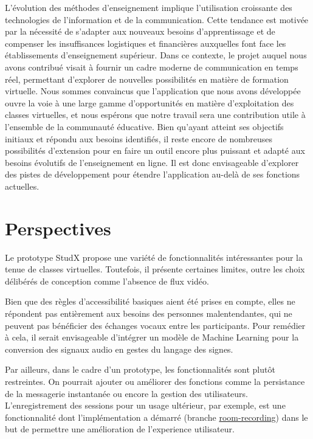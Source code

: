 \conclusion
L'évolution des méthodes d'enseignement implique l'utilisation croissante des technologies de l'information et de la communication. 
Cette tendance est motivée par la nécessité de s'adapter aux nouveaux besoins d'apprentissage et de compenser les insuffisances logistiques et 
financières auxquelles font face les établissements d'enseignement supérieur. Dans ce contexte, 
le projet auquel nous avons contribué visait à fournir un cadre moderne de communication en temps réel, 
permettant d'explorer de nouvelles possibilités en matière de formation virtuelle. 
Nous sommes convaincus que l'application que nous avons développée ouvre la voie à une large gamme d'opportunités en matière d'exploitation des classes virtuelles, 
et nous espérons que notre travail sera une contribution utile à l'ensemble de la communauté éducative.  
Bien qu'ayant atteint ses objectifs initiaux et répondu aux besoins identifiés, il reste encore de nombreuses possibilités d'extension pour en faire un outil encore plus puissant et adapté aux besoins évolutifs de l'enseignement en ligne. 
Il est donc envisageable d'explorer des pistes de développement pour étendre l'application au-delà de ses fonctions actuelles.

\section*{Perspectives}
Le prototype StudX propose une variété de fonctionnalités intéressantes pour la tenue de classes virtuelles.  
Toutefois, il présente certaines limites, outre les choix délibérés de conception comme l’absence de flux vidéo. 

Bien que des règles d'accessibilité basiques aient été prises en compte, elles ne répondent pas entièrement aux 
besoins des personnes malentendantes, qui ne peuvent pas bénéficier des échanges vocaux entre les participants. 
Pour remédier à cela, il serait envisageable d'intégrer un modèle de Machine Learning pour la conversion des signaux 
audio en gestes du langage des signes.

Par ailleurs, dans le cadre d’un prototype, les fonctionnalités sont plutôt restreintes. 
On pourrait ajouter ou améliorer des fonctions comme la persistance de la messagerie instantanée ou 
encore la gestion des utilisateurs. L'enregistrement des sessions pour un usage ultérieur, par exemple, est une fonctionnalité
dont l'implémentation a démarré (branche \href{https://github.com/tobihans/studx/tree/features/room-recording}{room-recording}) dans le but de permettre une amélioration de l'experience utilisateur.

